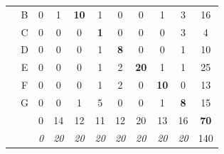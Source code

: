 \begin{table}[H]
\begin{tabular}{c c c c c c c c c c c}
		
		\\
		& \multicolumn{1}{|c}{B} & \multicolumn{1}{|c}{0} & \multicolumn{1}{c}{1} & \multicolumn{1}{c}{\textbf{10}} & \multicolumn{1}{c}{1} & \multicolumn{1}{c}{0} & \multicolumn{1}{c}{0} & \multicolumn{1}{c}{1} & \multicolumn{1}{c|}{3} & 16 \\
		& \multicolumn{1}{|c}{C} & \multicolumn{1}{|c}{0} & \multicolumn{1}{c}{0} & \multicolumn{1}{c}{0} & \multicolumn{1}{c}{\textbf{1}} & \multicolumn{1}{c}{0} & \multicolumn{1}{c}{0} & \multicolumn{1}{c}{0} & \multicolumn{1}{c|}{3} & 4 \\
		& \multicolumn{1}{|c}{D} & \multicolumn{1}{|c}{0} & \multicolumn{1}{c}{0} & \multicolumn{1}{c}{0} & \multicolumn{1}{c}{1} & \multicolumn{1}{c}{\textbf{8}} & \multicolumn{1}{c}{0} & \multicolumn{1}{c}{0} & \multicolumn{1}{c|}{1} & 10 \\
		& \multicolumn{1}{|c}{E} & \multicolumn{1}{|c}{0} & \multicolumn{1}{c}{0} & \multicolumn{1}{c}{0} & \multicolumn{1}{c}{1} & \multicolumn{1}{c}{2} & \multicolumn{1}{c}{\textbf{20}} & \multicolumn{1}{c}{1} & \multicolumn{1}{c|}{1} & 25 \\
		& \multicolumn{1}{|c}{F} & \multicolumn{1}{|c}{0} & \multicolumn{1}{c}{0} & \multicolumn{1}{c}{0} & \multicolumn{1}{c}{1} & \multicolumn{1}{c}{2} & \multicolumn{1}{c}{0} & \multicolumn{1}{c}{\textbf{10}} & \multicolumn{1}{c|}{0} & 13 \\
		& \multicolumn{1}{|c}{G} & \multicolumn{1}{|c}{0} & \multicolumn{1}{c}{0} & \multicolumn{1}{c}{1} & \multicolumn{1}{c}{5} & \multicolumn{1}{c}{0} & \multicolumn{1}{c}{0} & \multicolumn{1}{c}{1} & \multicolumn{1}{c|}{\textbf{8}} & 15 \\
		\cline{2-10}
		& & 0 & 14 & 12 & 11 & 12 & 20 & 13 & 16 & \textbf{70}\\
		\cline{3-11}
		& & \textit{0} & \textit{20} & \textit{20} & \textit{20} & \textit{20} & \textit{20} & \textit{20} & \textit{20} & 140\\
	\end{tabular}
\end{table}


